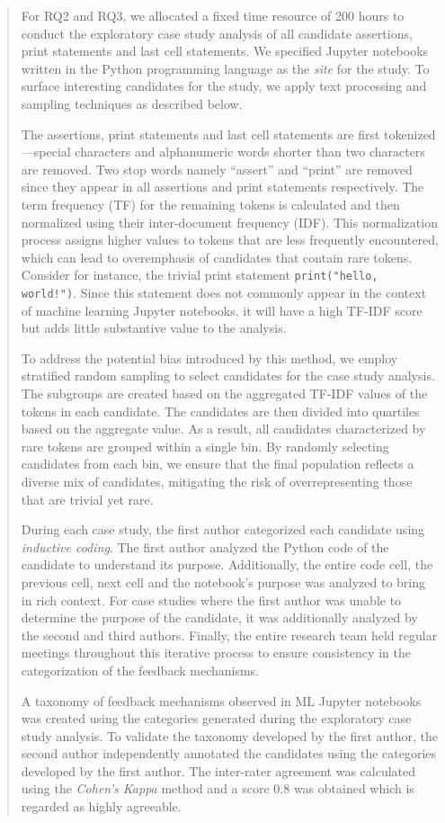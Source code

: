 \documentclass[11pt,fleqn]{article}
\begin{document}
\begin{quote}
  For RQ2 and RQ3, we allocated a fixed time resource of 200 hours to conduct the exploratory case study analysis of all candidate assertions, print statements and last cell statements. We specified Jupyter notebooks written in the Python programming language as the \emph{site} for the study. To surface interesting candidates for the study, we apply text processing and sampling techniques as described below.

  The assertions, print statements and last cell statements are first tokenized---special characters and alphanumeric words shorter than two characters are removed. Two stop words namely ``assert'' and ``print'' are removed since they appear in all assertions and print statements respectively. The term frequency (TF) for the remaining tokens is calculated and then normalized using their inter-document frequency (IDF). This normalization process assigns higher values to tokens that are less frequently encountered, which can lead to overemphasis of candidates that contain rare tokens. Consider for instance, the trivial print statement \texttt{print("hello, world!")}. Since this statement does not commonly appear in the context of machine learning Jupyter notebooks, it will have a high TF-IDF score but adds little substantive value to the analysis.

  To address the potential bias introduced by this method, we employ stratified random sampling to select candidates for the case study analysis. The subgroups are created based on the aggregated TF-IDF values of the tokens in each candidate. The candidates are then divided into quartiles based on the aggregate value. As a result, all candidates characterized by rare tokens are grouped within a single bin. By randomly selecting candidates from each bin, we ensure that the final population reflects a diverse mix of candidates, mitigating the risk of overrepresenting those that are trivial yet rare.

  During each case study, the first author categorized each candidate using \emph{inductive coding}. The first author analyzed the Python code of the candidate to understand its purpose. Additionally, the entire code cell, the previous cell, next cell and the notebook's purpose was analyzed to bring in rich context. For case studies where the first author was unable to determine the purpose of the candidate, it was additionally analyzed by the second and third authors. Finally, the entire research team held regular meetings throughout this iterative process to ensure consistency in the categorization of the feedback mechanisms.

  A taxonomy of feedback mechanisms observed in ML Jupyter notebooks was created using the categories generated during the exploratory case study analysis. To validate the taxonomy developed by the first author, the second author independently annotated the candidates using the categories developed by the first author. The inter-rater agreement was calculated using the \emph{Cohen's Kappa} method and a score 0.8 was obtained which is regarded as highly agreeable.
\end{quote}
\end{document}
